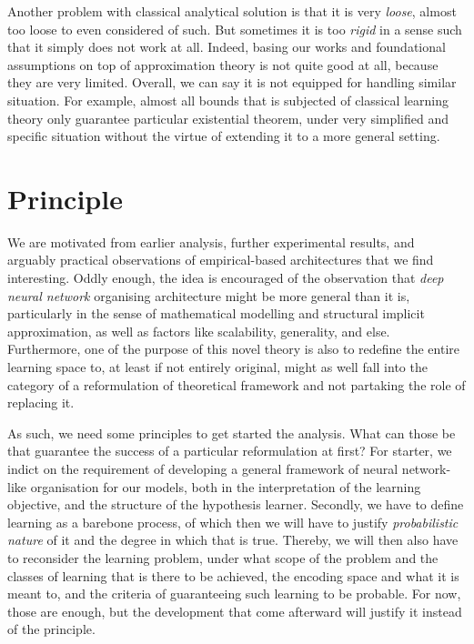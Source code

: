 Another problem with classical analytical solution is that it is very \textit{loose}, almost too loose to even considered of such. But sometimes it is too \textit{rigid} in a sense such that it simply does not work at all. Indeed, basing our works and foundational assumptions on top of approximation theory is not quite good at all, because they are very limited. Overall, we can say it is not equipped for handling similar situation. For example, almost all bounds that is subjected of classical learning theory only guarantee particular existential theorem, under very simplified and specific situation without the virtue of extending it to a more general setting. 



\section{Principle}

We are motivated from earlier analysis, further experimental results, and arguably practical observations of empirical-based architectures that we find interesting. Oddly enough, the idea is encouraged of the observation that \textit{deep neural network} organising architecture might be more general than it is, particularly in the sense of mathematical modelling and structural implicit approximation, as well as factors like scalability, generality, and else. Furthermore, one of the purpose of this novel theory is also to redefine the entire learning space to, at least if not entirely original, might as well fall into the category of a reformulation of theoretical framework and not partaking the role of replacing it. 

As such, we need some principles to get started the analysis. What can those be that guarantee the success of a particular reformulation at first? For starter, we indict on the requirement of developing a general framework of neural network-like organisation for our models, both in the interpretation of the learning objective, and the structure of the hypothesis learner. Secondly, we have to define learning as a barebone process, of which then we will have to justify \textit{probabilistic nature} of it and the degree in which that is true. Thereby, we will then also have to reconsider the learning problem, under what scope of the problem and the classes of learning that is there to be achieved, the encoding space and what it is meant to, and the criteria of guaranteeing such learning to be probable. For now, those are enough, but the development that come afterward will justify it instead of the principle. 

